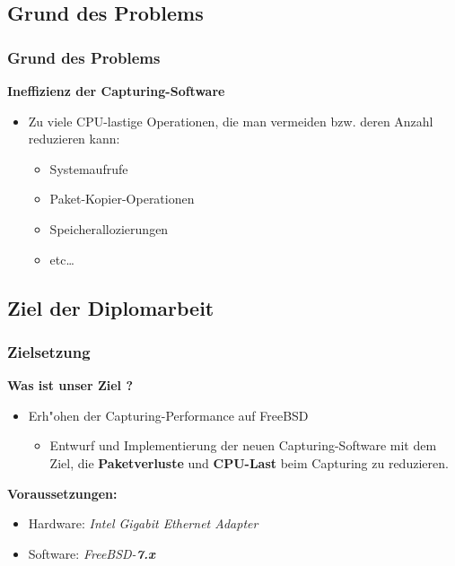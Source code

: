 \documentclass{beamer}
\begin{document}
\subsection*{Grund des Problems}
\begin{frame}
\frametitle{Grund des Problems}
\textbf{Ineffizienz der Capturing-Software}\newline
\begin{itemize}
	\item Zu viele CPU-lastige Operationen, die man vermeiden bzw. deren Anzahl reduzieren kann: 
\begin{itemize}
			\item Systemaufrufe
			\item Paket-Kopier-Operationen
			\item Speicherallozierungen
			\item etc\ldots\newline
\end{itemize}
\end{itemize}
\end{frame}

\subsection*{Ziel der Diplomarbeit}
\begin{frame}
\frametitle{Zielsetzung}
\textbf{Was ist unser Ziel ?}
\begin{itemize}
	\item Erh"ohen der Capturing-Performance auf FreeBSD
		\begin{itemize}
			\item Entwurf und Implementierung der neuen Capturing-Software mit dem Ziel,
				die \textbf{Paketverluste} und \textbf{CPU-Last} beim Capturing zu reduzieren. \newline
		\end{itemize}
\end{itemize}
\textbf{Voraussetzungen:}
\begin{itemize}
	\item Hardware: \emph{Intel Gigabit Ethernet Adapter}
	\item Software:	\emph{FreeBSD-\textbf{7.x}}
\end{itemize}
\end{frame}
\end{document}
